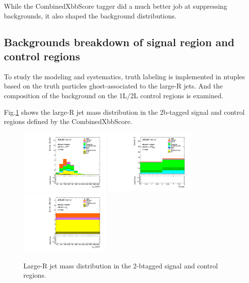 \par While the CombinedXbbScore tagger did a much better job at suppressing backgrounds, it also shaped the background distributions. 

\subsection{Backgrounds breakdown of signal region and control regions}

\par To study the modeling and systematics, truth labeling is implemented in ntuples based on the truth particles ghost-associated to the large-R jets.
And the composition of the background on the 1L/2L control regions is examined.

\par Fig.\ref{fig:fl_mj} shows the large-R jet mass distribution in the 2b-tagged signal and control regions defined by the CombinedXbbScore.

\begin{figure}[h]
    \centering
    \includegraphics[width=0.4\textwidth]{appendices/figures/Region_BMin500_incFat1_Fat1_incJet1_Y2015_DSR_T2_L0_distmBB_J0_Prefit.pdf}
    \includegraphics[width=0.4\textwidth]{appendices/figures/Region_BMin500_incFat1_Fat1_incJet1_Y2015_DCR1_T2_L1_distCharge_J0_Prefit.pdf}
    \includegraphics[width=0.4\textwidth]{appendices/figures/Region_BMin500_incFat1_Fat1_incJet1_Y2015_DCR2_T2_L2_distmBB_J0_Prefit.pdf}
    \caption{Large-R jet mass distribution in the 2-btagged signal and control regions.}
    \label{fig:fl_mj}
\end{figure}

